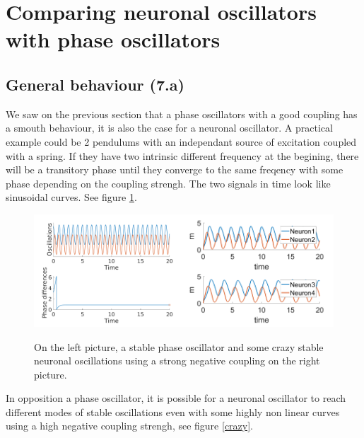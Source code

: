 \documentclass[a4paper]{scrartcl}
\begin{document}
\FloatBarrier

\section{Comparing neuronal oscillators with phase oscillators}
\subsection{General behaviour (7.a)}

We saw  on the previous section that a phase oscillators with a good coupling has a smouth behaviour, it is also the case for a neuronal oscillator. A practical example could be 2 pendulums with an independant source of excitation coupled with a spring. If they have two intrinsic different frequency at the begining, there will be a transitory phase until they converge to the same freqency with some phase depending on the coupling strengh. The two signals in time look like sinusoidal curves. See figure \ref{2phase}.

\begin{figure}[!h]
	\centering
	\includegraphics[width=0.5\textwidth]{fig/2phase.png}\includegraphics[width=0.5\textwidth]{fig/neuron1}
	\caption{On the left picture, a stable phase oscillator and some crazy stable neuronal oscillations using a strong negative coupling on the right picture.}\label{2phase}
\end{figure}

In opposition a phase oscillator, it is possible for a neuronal oscillator to reach different modes of stable oscillations even with some highly non linear curves using a high negative coupling strengh, see figure \ref{crazy}.
\end{document}
